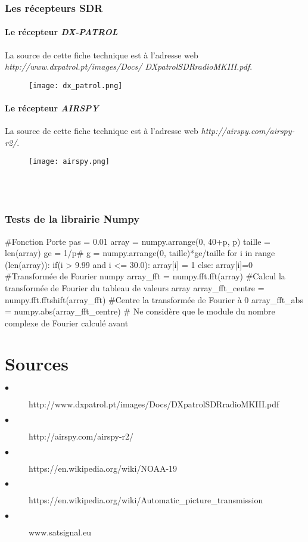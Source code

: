 \documentclass[12pt,fleqn]{book} %
\begin{document}
\section{Les récepteurs SDR}
\subsection{Le récepteur \emph{DX-PATROL}}
La source de cette fiche technique est à l'adresse web \emph{http://www.dxpatrol.pt/images/Docs/ DXpatrolSDRradioMKIII.pdf}.
\begin{figure}[H]
	\centering
	\texttt{[image: dx\_patrol.png]}
 \end{figure}
\subsection{Le récepteur \emph{AIRSPY}}
La source de cette fiche technique est à l'adresse web \emph{http://airspy.com/airspy-r2/}.
 \begin{figure}[H]
	\centering
	\texttt{[image: airspy.png]}
 \end{figure}
~\\\\
\section{Tests de la librairie Numpy}
\begin{python}
 #Fonction Porte
 pas = 0.01
 array = numpy.arrange(0, 40+p, p)
 taille = len(array)
 ge = 1/p#
 g = numpy.arrange(0, taille)*ge/taille
 for i in range (len(array)):
     if(i > 9.99 and i <= 30.0):
          array[i] = 1
      else:
          array[i]=0
 #Transformée de Fourier numpy
 array_fft = numpy.fft.fft(array) #Calcul la transformée de Fourier du tableau de valeurs array
 array_fft_centre = numpy.fft.fftshift(array_fft) #Centre la transformée de Fourier à 0
 array_fft_abs = numpy.abs(array_fft_centre) # Ne considère que le module du nombre complexe de Fourier calculé avant
\end{python}
\setcounter{part}{-6}
\part{Sources}

\appendix

\begin{description}
\item[$\bullet$] http://www.dxpatrol.pt/images/Docs/DXpatrolSDRradioMKIII.pdf
\item[$\bullet$] http://airspy.com/airspy-r2/
\item[$\bullet$] https://en.wikipedia.org/wiki/NOAA-19
\item[$\bullet$] https://en.wikipedia.org/wiki/Automatic\_picture\_transmission
\item[$\bullet$] www.satsignal.eu
\end{description} 
\end{document}
